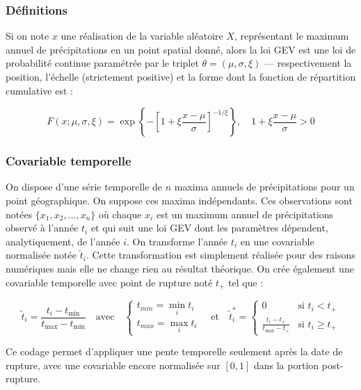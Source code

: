 \documentclass[
  article,
  nofooter,
  noheadings]{jss}
\begin{document}
\subsubsection{Définitions}\label{duxe9finitions}

Si on note \(x\) une réalisation de la variable aléatoire \(X\),
représentant le maximum annuel de précipitations en un point spatial
donné, alors la loi GEV est une loi de probabilité continue paramétrée
par le triplet \(\theta = (\mu, \sigma, \xi)\) --- respectivement la
position, l'échelle (strictement positive) et la forme dont la fonction
de répartition cumulative est :

\[
F(x;\mu ,\sigma ,\xi) = \exp\left\{-\left[1 + \xi\frac{x - \mu}{\sigma}\right]^{-1/\xi}\right\}, \quad 1 + \xi\frac{x - \mu}{\sigma} > 0
\]

\subsubsection{Covariable temporelle}\label{covariable-temporelle}

On dispose d'une série temporelle de \(n\) maxima annuels de
précipitations pour un point géographique. On suppose ces maxima
indépendants. Ces observations sont notées \(\{x_1, x_2, \dots, x_n\}\)
où chaque \(x_i\) est un maximum annuel de précipitations observé à
l'année \(t_i\) et qui suit une loi GEV dont les paramètres dépendent,
analytiquement, de l'année \(i\). On transforme l'année \(t_i\) en une
covariable normalisée notée \(\tilde{t}_i\). Cette transformation est
simplement réalisée pour des raisons numériques mais elle ne change rien
au résultat théorique. On crée également une covariable temporelle avec
point de rupture noté \(t_+\) tel que :

\[
\tilde{t}_i = \frac{t_i - t_{\min}}{t_{\max} - t_{\min}} \quad \text{avec} \quad \begin{cases}
t_{min} = \min_i t_i \\
t_{max} = \max_i t_i
\end{cases} \quad \text{et} \quad
\tilde{t}_{i}^\ast =
\begin{cases}
0 & \text{si } t_i < t_+ \\
\displaystyle \frac{t_i - t_+}{t_{\max} - t_+} & \text{si } t_i \ge t_+
\end{cases}
\]

Ce codage permet d'appliquer une pente temporelle seulement après la
date de rupture, avec une covariable encore normalisée sur \([0,1]\)
dans la portion post-rupture.
\end{document}
